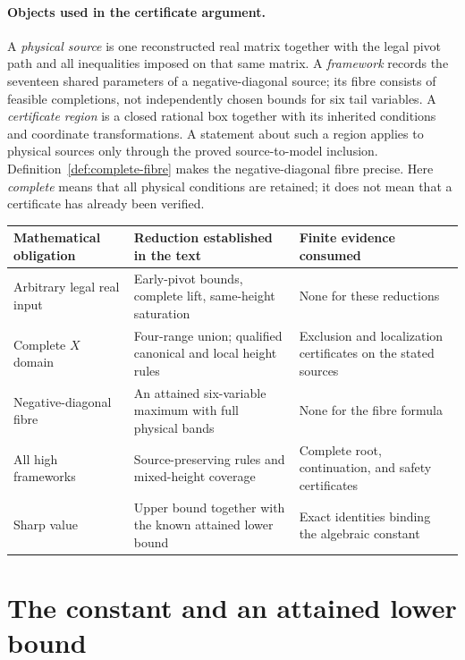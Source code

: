\documentclass[11pt,reqno]{amsart}
\theoremstyle{definition}
\theoremstyle{remark}
\begin{document}
\paragraph{Objects used in the certificate argument.}
A \emph{physical source} is one reconstructed real matrix together with
the legal pivot path and all inequalities imposed on that same matrix.
A \emph{framework} records the seventeen shared parameters of a
negative-diagonal source; its fibre consists of feasible completions,
not independently chosen bounds for six tail variables. A
\emph{certificate region} is a closed rational box together with its
inherited conditions and coordinate transformations. A statement about
such a region applies to physical sources only through the proved
source-to-model inclusion. Definition~\ref{def:complete-fibre} makes the
negative-diagonal fibre precise. Here \emph{complete} means that all
physical conditions are retained; it does not mean that a certificate
has already been verified.

\begin{center}
\small
\begin{tabular}{@{}>{\raggedright\arraybackslash}p{.25\linewidth}>{\raggedright\arraybackslash}p{.32\linewidth}>{\raggedright\arraybackslash}p{.33\linewidth}@{}}
\toprule
Mathematical obligation&Reduction established in the text&Finite evidence consumed\\
\midrule
Arbitrary legal real input&Early-pivot bounds, complete lift, same-height saturation&None for these reductions\\
Complete \(X\) domain&Four-range union; qualified canonical and local height rules&Exclusion and localization certificates on the stated sources\\
Negative-diagonal fibre&An attained six-variable maximum with full physical bands&None for the fibre formula\\
All high frameworks&Source-preserving rules and mixed-height coverage&Complete root, continuation, and safety certificates\\
Sharp value&Upper bound together with the known attained lower bound&Exact identities binding the algebraic constant\\
\bottomrule
\end{tabular}
\end{center}


\section{The constant and an attained lower bound}\label{sec:alpha}
\end{document}
